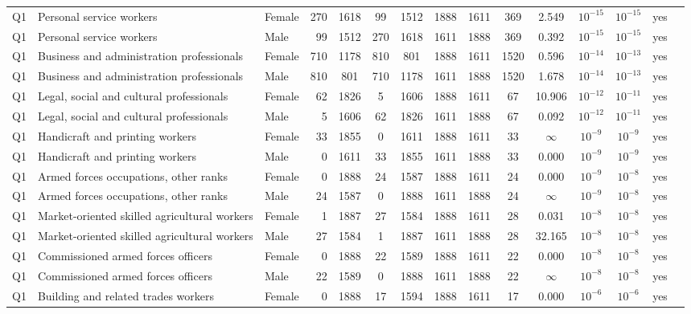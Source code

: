 \begin{longtable}{lllrcccccccccll}
Q1 & Personal service workers & Female & 270 & 1618 & 99 & 1512 & 1888 & 1611 & 369 & 2.549 & $10^{-15}$ & $10^{-15}$ & yes \\
Q1 & Personal service workers & Male & 99 & 1512 & 270 & 1618 & 1611 & 1888 & 369 & 0.392 & $10^{-15}$ & $10^{-15}$ & yes \\
Q1 & Business and administration professionals & Female & 710 & 1178 & 810 & 801 & 1888 & 1611 & 1520 & 0.596 & $10^{-14}$ & $10^{-13}$ & yes \\
Q1 & Business and administration professionals & Male & 810 & 801 & 710 & 1178 & 1611 & 1888 & 1520 & 1.678 & $10^{-14}$ & $10^{-13}$ & yes \\
Q1 & Legal, social and cultural professionals & Female & 62 & 1826 & 5 & 1606 & 1888 & 1611 & 67 & 10.906 & $10^{-12}$ & $10^{-11}$ & yes \\
Q1 & Legal, social and cultural professionals & Male & 5 & 1606 & 62 & 1826 & 1611 & 1888 & 67 & 0.092 & $10^{-12}$ & $10^{-11}$ & yes \\
Q1 & Handicraft and printing workers & Female & 33 & 1855 & 0 & 1611 & 1888 & 1611 & 33 & $\infty$ & $10^{-9}$ & $10^{-9}$ & yes \\
Q1 & Handicraft and printing workers & Male & 0 & 1611 & 33 & 1855 & 1611 & 1888 & 33 & 0.000 & $10^{-9}$ & $10^{-9}$ & yes \\
Q1 & Armed forces occupations, other ranks & Female & 0 & 1888 & 24 & 1587 & 1888 & 1611 & 24 & 0.000 & $10^{-9}$ & $10^{-8}$ & yes \\
Q1 & Armed forces occupations, other ranks & Male & 24 & 1587 & 0 & 1888 & 1611 & 1888 & 24 & $\infty$ & $10^{-9}$ & $10^{-8}$ & yes \\
Q1 & Market-oriented skilled agricultural workers & Female & 1 & 1887 & 27 & 1584 & 1888 & 1611 & 28 & 0.031 & $10^{-8}$ & $10^{-8}$ & yes \\
Q1 & Market-oriented skilled agricultural workers & Male & 27 & 1584 & 1 & 1887 & 1611 & 1888 & 28 & 32.165 & $10^{-8}$ & $10^{-8}$ & yes \\
Q1 & Commissioned armed forces officers & Female & 0 & 1888 & 22 & 1589 & 1888 & 1611 & 22 & 0.000 & $10^{-8}$ & $10^{-8}$ & yes \\
Q1 & Commissioned armed forces officers & Male & 22 & 1589 & 0 & 1888 & 1611 & 1888 & 22 & $\infty$ & $10^{-8}$ & $10^{-8}$ & yes \\
Q1 & Building and related trades workers & Female & 0 & 1888 & 17 & 1594 & 1888 & 1611 & 17 & 0.000 & $10^{-6}$ & $10^{-6}$ & yes \\

\end{longtable}
